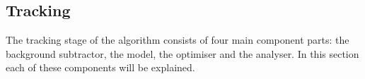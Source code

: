\pagebreak
\subsection{Tracking}
\label{sec:tracking}

The tracking stage of the algorithm consists of four main component parts: the background subtractor, the model, the optimiser and the analyser. In this section each of these components will be explained.







